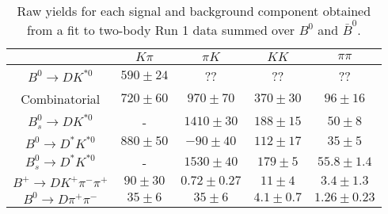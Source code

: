 \begin{table}
  \centering
  \begin{tabular}{ccccc}
      \toprule
       & $K\pi$ & $\pi K$ & $KK$ & $\pi\pi$ \\
      \midrule
      $B^0 \to DK^{*0}$ & $590 \pm 24$ & ?? & ?? & ?? \\
      Combinatorial & $720 \pm 60$ & $970 \pm 70$ & $370 \pm 30$ & $96 \pm 16$ \\
      $B^0_s \to DK^{*0}$ & \-- & $1410 \pm 30$ & $188 \pm 15$ & $50 \pm 8$ \\
      $B^0 \to D^*K^{*0}$ & $880 \pm 50$ & $-90 \pm 40$ & $112 \pm 17$ & $35 \pm 5$ \\
      $B^0_s \to D^*K^{*0}$ & \-- & $1530 \pm 40$ & $179 \pm 5$ & $55.8 \pm 1.4$ \\
      $B^+ \to DK^+\pi^-\pi^+$ & $90 \pm 30$ & $0.72 \pm 0.27$ & $11 \pm 4$ & $3.4 \pm 1.3$ \\
      $B^0 \to D\pi^+\pi^-$ & $35 \pm 6$ & $35 \pm 6$ & $4.1 \pm 0.7$ & $1.26 \pm 0.23$ \\
      \bottomrule
      \end{tabular}
  \caption{Raw yields for each signal and background component obtained from a fit to two-body Run 1 data summed over $B^0$ and $\bar{B}^0$.}
\label{tab:yields_combined_2body_run1}
\end{table}
